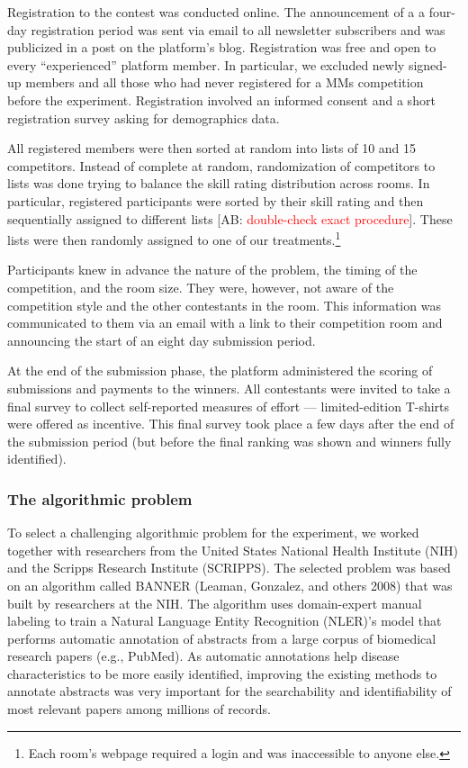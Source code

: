 \documentclass[11pt, titlepage]{article}
\begin{document}
Registration to the contest was conducted online. The announcement of a
a four-day registration period was sent via email to all newsletter
subscribers and was publicized in a post on the platform's blog.
Registration was free and open to every ``experienced'' platform member.
In particular, we excluded newly signed-up members and all those who had
never registered for a MMs competition before the experiment.
Registration involved an informed consent and a short registration
survey asking for demographics data.

All registered members were then sorted at random into lists of 10 and
15 competitors. Instead of complete at random, randomization of
competitors to lists was done trying to balance the skill rating
distribution across rooms. In particular, registered participants were
sorted by their skill rating and then sequentially assigned to different
lists {[}AB: \textcolor{red}{double-check exact procedure}{]}. These
lists were then randomly assigned to one of our treatments.\footnote{Each
  room's webpage required a login and was inaccessible to anyone else.}

Participants knew in advance the nature of the problem, the timing of
the competition, and the room size. They were, however, not aware of the
competition style and the other contestants in the room. This
information was communicated to them via an email with a link to their
competition room and announcing the start of an eight day submission
period.

At the end of the submission phase, the platform administered the
scoring of submissions and payments to the winners. All contestants were
invited to take a final survey to collect self-reported measures of
effort --- limited-edition T-shirts were offered as incentive. This
final survey took place a few days after the end of the submission
period (but before the final ranking was shown and winners fully
identified).

\subsubsection{The algorithmic problem}\label{the-algorithmic-problem}

To select a challenging algorithmic problem for the experiment, we
worked together with researchers from the United States National Health
Institute (NIH) and the Scripps Research Institute (SCRIPPS). The
selected problem was based on an algorithm called BANNER (Leaman,
Gonzalez, and others 2008) that was built by researchers at the NIH. The
algorithm uses domain-expert manual labeling to train a Natural Language
Entity Recognition (NLER)'s model that performs automatic annotation of
abstracts from a large corpus of biomedical research papers (e.g.,
PubMed). As automatic annotations help disease characteristics to be
more easily identified, improving the existing methods to annotate
abstracts was very important for the searchability and identifiability
of most relevant papers among millions of records.
\end{document}
